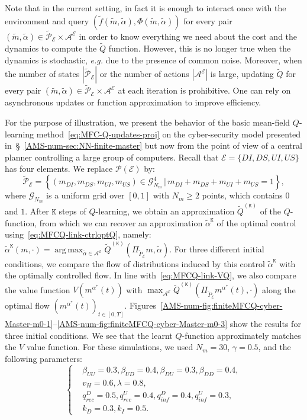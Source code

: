 \documentclass{amsproc}
\theoremstyle{definition}
\theoremstyle{remark}
\numberwithin{equation}{section}
\newcommand{\cA}{{\mathcal A}}
\newcommand{\cE}{{\mathcal E}}
\newcommand{\cG}{{\mathcal G}}
\newcommand{\cP}{{\mathcal P}}
\newcommand{\ctrl}{\alpha}
\DeclareMathOperator*{\argmax}{arg\,max}
\begin{document}
Note that in the current setting, in fact it is enough to interact once with the environment and query $(\tilde f(\tilde m,\tilde \ctrl), \Phi(\tilde m, \tilde \ctrl))$ for every pair $(\tilde m, \tilde \ctrl) \in \tilde \cP_\cE \times \cA^\cE$ in order to know everything we need about the cost and the dynamics to compute the $\tilde Q$ function. However, this is no longer true when the dynamics is stochastic, \textit{e.g.} due to the presence of common noise. 
 Moreover, when the number of states $|\tilde\cP_\cE|$ or the number of actions $|\cA^\cE|$ is large, updating $\tilde Q$ for every pair $(\tilde m,\tilde \ctrl) \in \tilde\cP_\cE \times \cA^\cE$ at each iteration is prohibitive. One can rely on asynchronous updates or function approximation to improve efficiency. 

For the purpose of illustration, we present the behavior of the basic mean-field $Q$-learning method~\eqref{eq:MFC-Q-updates-proj}  on  
the cyber-security model presented in~\S~\ref{AMS-num-sec:NN-finite-master} but now from the point of view of a central planner controlling a large group of computers. Recall that $\cE = \{DI, DS, UI, US\}$ has four elements. 
We replace $\cP(\cE)$ by:
$$
	\tilde\cP_\cE = \left\{ (m_{DI}, m_{DS}, m_{UI}, m_{US} ) \in \cG_{N_m}^4 \,\big|\, m_{DI} + m_{DS} + m_{UI} + m_{US} = 1 \right\},
$$
where $\cG_{N_m}$ is a uniform grid over $[0,1]$ with $N_m \ge 2$ points, which contains $0$ and $1$. After $\mathtt{K}$ steps of $Q$-learning, we obtain an approximation $\tilde Q^{(\mathtt{K})}$ of the $Q$-function, from which we can recover an approximation $\tilde\ctrl^{\mathtt{K}}$ of the optimal control using~\eqref{eq:MFCQ-link-ctrloptQ},
namely: $\tilde\ctrl^{\mathtt{K}}(m, \cdot) = \argmax_{\tilde \ctrl \in \cA^\cE} \tilde Q^{(\mathtt{K})}(\Pi_{\tilde P_\cE} m, \tilde \ctrl)$. 
 For three different initial conditions, we compare the flow of distributions induced by this control $\tilde\ctrl^{\mathtt{K}}$ with the optimally controlled flow. In line with~\eqref{eq:MFCQ-link-VQ}, we also compare the value function $V(m^{\ctrl^*}(t))$ with $\max_{\cA^\cE}\tilde Q^{(\mathtt{K})}(\Pi_{\tilde P_\cE} m^{\ctrl^*}(t), \cdot)$ along the optimal flow $(m^{\ctrl^*}(t))_{t\in[0,T]}$. Figures~\ref{AMS-num-fig:finiteMFCQ-cyber-Master-m0-1}--\ref{AMS-num-fig:finiteMFCQ-cyber-Master-m0-3} show the results for three initial conditions. We see that the learnt $Q$-function approximately matches the $V$ value function.   
For these simulations, we used $N_m = 30$, $\gamma = 0.5$, and the following parameters:
\begin{equation*}
\left\{
\begin{split}
&\beta_{UU} = 0.3,
\beta_{UD} = 0.4,
\beta_{DU} = 0.3,
\beta_{DD} = 0.4,
\\
&v_H = 0.6,
\lambda = 0.8,
\\
&q_{rec}^D = 0.5, 
q_{rec}^U = 0.4, 
q_{inf}^D = 0.4, 
q_{inf}^U = 0.3, 
\\
&k_D = 0.3, 
k_I = 0.5.
\end{split}
\right.
\end{equation*}
\end{document}
